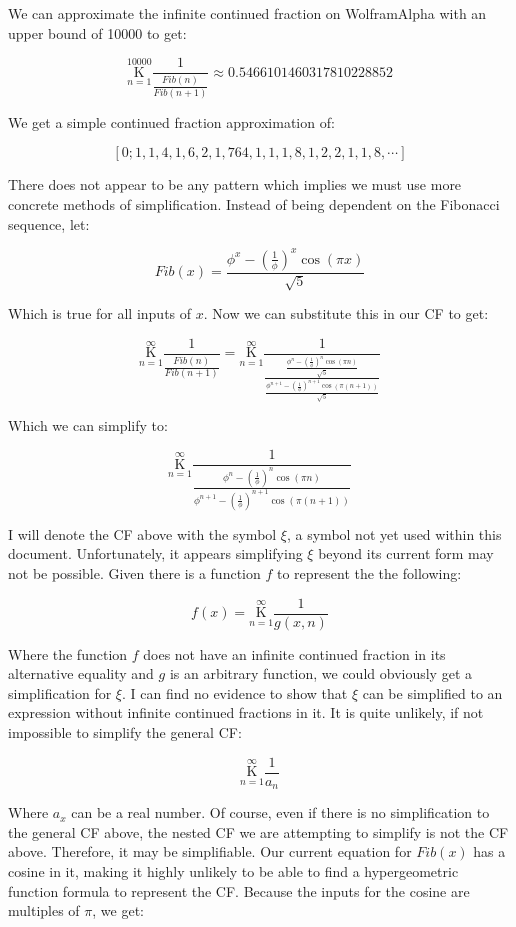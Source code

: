 \documentclass{article}
\begin{document}
We can approximate the infinite continued fraction on WolframAlpha with an upper bound of 10000 to get:

$$\underset{n=1}{\overset{10000}{ \mathrm K}} \frac{1}{ \frac{Fib(n)}{Fib(n+1)} } \approx 0.5466101460317810228852$$

We get a simple continued fraction approximation of:

$$[0;1,1,4,1,6,2,1,764,1,1,1,8,1,2,2,1,1,8,\cdots]$$

There does not appear to be any pattern which implies we must use more concrete methods of simplification. Instead of being dependent on the Fibonacci sequence, let:

$$Fib(x)=\frac{\phi^x-(\frac{1}{\phi})^x \cos(\pi x)}{\sqrt{5}}$$

Which is true for all inputs of $x$. Now we can substitute this in our CF to get:

$$\underset{n=1}{\overset{\infty}{ \mathrm K}} \frac{1}{ \frac{Fib(n)}{Fib(n+1)} } = \underset{n=1}{\overset{\infty}{ \mathrm K}} \frac{1}{ \frac{\frac{\phi^n-(\frac{1}{\phi})^n \cos(\pi n)}{\sqrt{5}}}{\frac{\phi^{n+1}-(\frac{1}{\phi})^{n+1} \cos(\pi (n+1))}{\sqrt{5}}} }$$

Which we can simplify to:

$$\underset{n=1}{\overset{\infty}{ \mathrm K}} \frac{1}{\frac{\phi^n-(\frac{1}{\phi})^n \cos(\pi n)}{\phi^{n+1}-(\frac{1}{\phi})^{n+1} \cos(\pi (n+1))}}$$

I will denote the CF above with the symbol $\xi$, a symbol not yet used within this document. Unfortunately, it appears simplifying $\xi$ beyond its current form may not be possible. Given there is a function $f$ to represent the the following:

$$f(x)=\underset{n=1}{\overset{\infty}{ \mathrm K}} \frac{1}{g(x,n)}$$

Where the function $f$ does not have an infinite continued fraction in its alternative equality and $g$ is an arbitrary function, we could obviously get a simplification for $\xi$. I can find no evidence to show that $\xi$ can be simplified to an expression without infinite continued fractions in it. It is quite unlikely, if not impossible to simplify the general CF:

$$\underset{n=1}{\overset{\infty}{ \mathrm K}} \frac{1}{a_n}$$

Where $a_x$ can be a real number. Of course, even if there is no simplification to the general CF above, the nested CF we are attempting to simplify is not the CF above. Therefore, it may be simplifiable. Our current equation for $Fib(x)$ has a cosine in it, making it highly unlikely to be able to find a hypergeometric function formula to represent the CF. Because the inputs for the cosine are multiples of $\pi$, we get:
\end{document}
